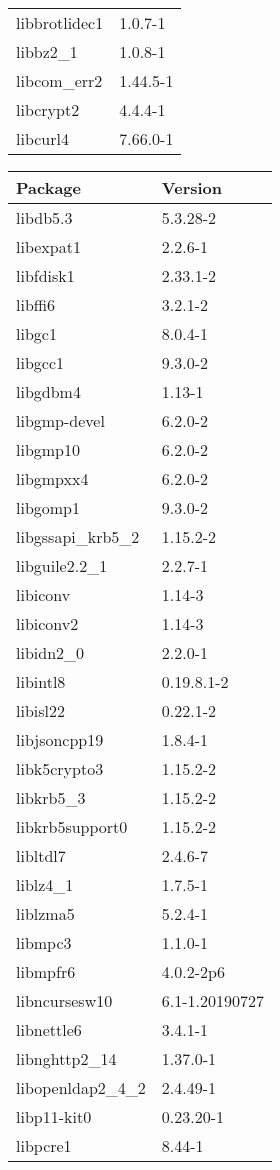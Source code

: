\documentclass[10pt, english, openany]{report}
\begin{document}
\begin{appendices}
\begin{center}
\begin{tabular}{|m{4cm}|m{4cm}|}
libbrotlidec1 & 1.0.7-1 \\
libbz2\_1 & 1.0.8-1 \\
libcom\_err2 & 1.44.5-1 \\
libcrypt2 & 4.4.4-1 \\
libcurl4 & 7.66.0-1 \\
\hline
\end{tabular}
\begin{tabular}{|m{3cm}|m{3cm}|}
Package & Version \\
\hline
libdb5.3 & 5.3.28-2 \\
libexpat1 & 2.2.6-1 \\
libfdisk1 & 2.33.1-2 \\
libffi6 & 3.2.1-2 \\
libgc1 & 8.0.4-1 \\
libgcc1 & 9.3.0-2 \\
libgdbm4 & 1.13-1 \\
libgmp-devel & 6.2.0-2 \\
libgmp10 & 6.2.0-2 \\
libgmpxx4 & 6.2.0-2 \\
libgomp1 & 9.3.0-2 \\
libgssapi\_krb5\_2 & 1.15.2-2 \\
libguile2.2\_1 & 2.2.7-1 \\
libiconv & 1.14-3 \\
libiconv2 & 1.14-3 \\
libidn2\_0 & 2.2.0-1 \\
libintl8 & 0.19.8.1-2 \\
libisl22 & 0.22.1-2 \\
libjsoncpp19 & 1.8.4-1 \\
libk5crypto3 & 1.15.2-2 \\
libkrb5\_3 & 1.15.2-2 \\
libkrb5support0 & 1.15.2-2 \\
libltdl7 & 2.4.6-7 \\
liblz4\_1 & 1.7.5-1 \\
liblzma5 & 5.2.4-1 \\
libmpc3 & 1.1.0-1 \\
libmpfr6 & 4.0.2-2p6 \\
libncursesw10 & 6.1-1.20190727 \\
libnettle6 & 3.4.1-1 \\
libnghttp2\_14 & 1.37.0-1 \\
libopenldap2\_4\_2 & 2.4.49-1 \\
libp11-kit0 & 0.23.20-1 \\
libpcre1 & 8.44-1 \\

\end{tabular}
\end{center}
\end{appendices}
\end{document}
